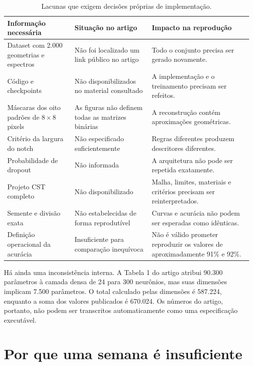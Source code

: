 \documentclass[11pt,a4paper]{article}
\begin{document}
\begin{table}[htbp]
\centering
\small
\caption{Lacunas que exigem decisões próprias de implementação.}
\label{tab:lacunas}
\begin{tabularx}{\textwidth}{@{}p{}p{}Y@{}}
\toprule
Informação necessária & Situação no artigo & Impacto na reprodução \\
\midrule
Dataset com 2.000 geometrias e espectros & Não foi localizado um link público no artigo & Todo o conjunto precisa ser gerado novamente. \\
\addlinespace
Código e checkpoints & Não disponibilizados no material consultado & A implementação e o treinamento precisam ser refeitos. \\
\addlinespace
Máscaras dos oito padrões de $8\times8$ pixels & As figuras não definem todas as matrizes binárias & A reconstrução contém aproximações geométricas. \\
\addlinespace
Critério da largura do notch & Não especificado suficientemente & Regras diferentes produzem descritores diferentes. \\
\addlinespace
Probabilidade de dropout & Não informada & A arquitetura não pode ser repetida exatamente. \\
\addlinespace
Projeto CST completo & Não disponibilizado & Malha, limites, materiais e critérios precisam ser reinterpretados. \\
\addlinespace
Semente e divisão exata & Não estabelecidas de forma reprodutível & Curvas e acurácia não podem ser esperadas como idênticas. \\
\addlinespace
Definição operacional da acurácia & Insuficiente para comparação inequívoca & Não é válido prometer reproduzir os valores de aproximadamente 91\% e 92\%. \\
\bottomrule
\end{tabularx}
\end{table}

Há ainda uma inconsistência interna. A Tabela 1 do artigo atribui 90.300 parâmetros à camada densa de 24 para 300 neurônios, mas suas dimensões implicam 7.500 parâmetros. O total calculado pelas dimensões é 587.224, enquanto a soma dos valores publicados é 670.024. Os números do artigo, portanto, não podem ser transcritos automaticamente como uma especificação executável.

\section{Por que uma semana é insuficiente}
\end{document}
